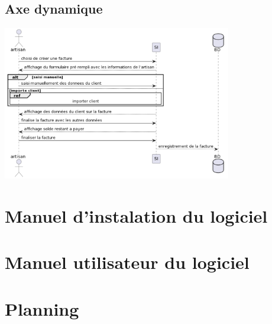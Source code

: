 \documentclass[a4paper,10pt]{scrartcl}
\begin{document}
\subsection{Axe dynamique}
\centerline{\includegraphics[width=10cm]{dyn.png}}

\section{Manuel d'instalation du logiciel}
\section{Manuel utilisateur du logiciel}
\section{Planning}
\end{document}
